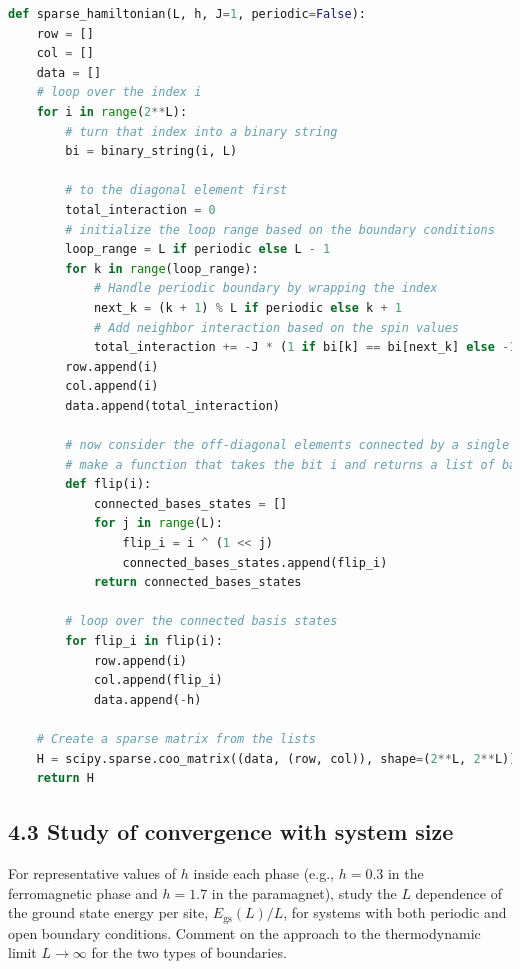 \documentclass[12pt]{article}
\begin{document}
\begin{lstlisting}[language=Python]
def sparse_hamiltonian(L, h, J=1, periodic=False):
    row = []
    col = []
    data = []
    # loop over the index i
    for i in range(2**L):
        # turn that index into a binary string
        bi = binary_string(i, L)

        # to the diagonal element first
        total_interaction = 0
        # initialize the loop range based on the boundary conditions
        loop_range = L if periodic else L - 1
        for k in range(loop_range):
            # Handle periodic boundary by wrapping the index
            next_k = (k + 1) % L if periodic else k + 1
            # Add neighbor interaction based on the spin values
            total_interaction += -J * (1 if bi[k] == bi[next_k] else -1)
        row.append(i)
        col.append(i)
        data.append(total_interaction)

        # now consider the off-diagonal elements connected by a single spin flip
        # make a function that takes the bit i and returns a list of basis states connected by a single flip
        def flip(i):
            connected_bases_states = []
            for j in range(L):
                flip_i = i ^ (1 << j)
                connected_bases_states.append(flip_i)
            return connected_bases_states
        
        # loop over the connected basis states
        for flip_i in flip(i):
            row.append(i)
            col.append(flip_i)
            data.append(-h)       

    # Create a sparse matrix from the lists
    H = scipy.sparse.coo_matrix((data, (row, col)), shape=(2**L, 2**L))
    return H
\end{lstlisting}



\subsection*{4.3 Study of convergence with system size}
For representative values of $h$ inside each phase (e.g., $h=0.3$ in the ferromagnetic phase and $h=1.7$ in the paramagnet), study the $L$ dependence of the ground state energy per site, $E_{\mathrm{gs}}(L) / L$, for systems with both periodic and open boundary conditions. Comment on the approach to the thermodynamic limit $L \rightarrow \infty$ for the two types of boundaries.
\end{document}
